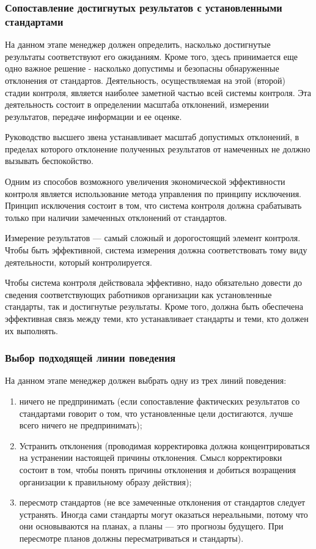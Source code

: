 \documentclass[a4paper,12pt,oneside,final]{extarticle}
\numberwithin{equation}{section}
\begin{document}
\subsubsection{Сопоставление достигнутых результатов с установленными стандартами}
На данном этапе менеджер должен определить, насколько достигнутые результаты соответствуют его ожиданиям. 
Кроме того, здесь принимается еще одно важное решение - насколько допустимы и безопасны обнаруженные отклонения от стандартов. 
Деятельность, осуществляемая на этой (второй) стадии контроля, является наиболее заметной частью всей системы контроля. 
Эта деятельность состоит в определении масштаба отклонений, измерении результатов, передаче информации и ее оценке.

Руководство высшего звена устанавливает масштаб допустимых отклонений, в пределах которого отклонение полученных результатов от намеченных не должно вызывать беспокойство.

Одним из способов возможного увеличения экономической эффективности контроля является использование метода управления по принципу исключения. 
Принцип исключения состоит в том, что система контроля должна срабатывать только при наличии замеченных отклонений от стандартов.

Измерение результатов --- самый сложный и дорогостоящий элемент контроля. 
Чтобы быть эффективной, система измерения должна соответствовать тому виду деятельности, который контролируется.

Чтобы система контроля действовала эффективно, надо обязательно довести до сведения соответствующих работников организации как установленные стандарты, так и достигнутые результаты. 
Кроме того, должна быть обеспечена эффективная связь между теми, кто устанавливает стандарты и теми, кто должен их выполнять.

\subsubsection{Выбор подходящей линии поведения}
На данном этапе менеджер должен выбрать одну из трех линий поведения:
\begin{enumerate}
	\item ничего не предпринимать (если сопоставление фактических результатов со стандартами говорит о том, что установленные цели достигаются, лучше всего ничего не предпринимать);
	\item Устранить отклонения (проводимая корректировка должна концентрироваться на устранении настоящей причины отклонения. 
	Смысл корректировки состоит в том, чтобы понять причины отклонения и добиться возращения организации к правильному образу действия);
	\item пересмотр стандартов (не все замеченные отклонения от стандартов следует устранять. 
	Иногда сами стандарты могут оказаться нереальными, потому что они основываются на планах, а планы --- это прогнозы будущего. 
	При пересмотре планов должны пересматриваться и стандарты).
\end{enumerate}
\end{document}
